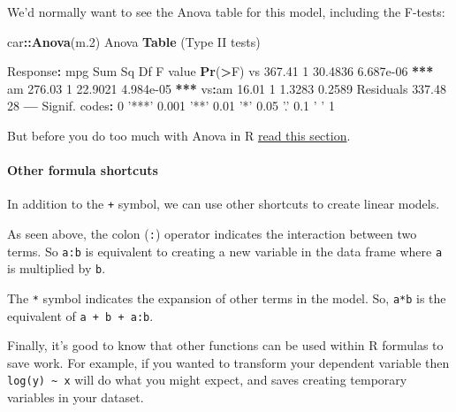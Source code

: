 \documentclass[]{article}
\newenvironment{Shaded}{\begin{snugshade}}{\end{snugshade}}
\newcommand{\DecValTok}[1]{\textcolor[rgb]{0.00,0.00,0.81}{#1}}
\newcommand{\ErrorTok}[1]{\textcolor[rgb]{0.64,0.00,0.00}{\textbf{#1}}}
\newcommand{\FloatTok}[1]{\textcolor[rgb]{0.00,0.00,0.81}{#1}}
\newcommand{\KeywordTok}[1]{\textcolor[rgb]{0.13,0.29,0.53}{\textbf{#1}}}
\newcommand{\NormalTok}[1]{#1}
\newcommand{\OperatorTok}[1]{\textcolor[rgb]{0.81,0.36,0.00}{\textbf{#1}}}
\newcommand{\StringTok}[1]{\textcolor[rgb]{0.31,0.60,0.02}{#1}}
\let\oldparagraph\paragraph
\renewcommand{\paragraph}[1]{\oldparagraph{#1}\mbox{}}
\begin{document}
We'd normally want to see the Anova table for this model, including the F-tests:

\begin{Shaded}
\begin{Highlighting}[]
\NormalTok{car}\OperatorTok{::}\KeywordTok{Anova}\NormalTok{(m}\FloatTok{.2}\NormalTok{)}
\NormalTok{Anova }\KeywordTok{Table}\NormalTok{ (Type II tests)}

\NormalTok{Response}\OperatorTok{:}\StringTok{ }\NormalTok{mpg}
\NormalTok{          Sum Sq Df F value    }\KeywordTok{Pr}\NormalTok{(}\OperatorTok{>}\NormalTok{F)    }
\NormalTok{vs        }\FloatTok{367.41}  \DecValTok{1} \FloatTok{30.4836} \FloatTok{6.687e-06} \OperatorTok{**}\ErrorTok{*}
\NormalTok{am        }\FloatTok{276.03}  \DecValTok{1} \FloatTok{22.9021} \FloatTok{4.984e-05} \OperatorTok{**}\ErrorTok{*}
\NormalTok{vs}\OperatorTok{:}\NormalTok{am      }\FloatTok{16.01}  \DecValTok{1}  \FloatTok{1.3283}    \FloatTok{0.2589}    
\NormalTok{Residuals }\FloatTok{337.48} \DecValTok{28}                      
\OperatorTok{---}
\NormalTok{Signif. codes}\OperatorTok{:}\StringTok{  }\DecValTok{0} \StringTok{'***'} \FloatTok{0.001} \StringTok{'**'} \FloatTok{0.01} \StringTok{'*'} \FloatTok{0.05} \StringTok{'.'} \FloatTok{0.1} \StringTok{' '} \DecValTok{1}
\end{Highlighting}
\end{Shaded}

But before you do too much with Anova in R \href{anova.html}{read this section}.

\hypertarget{other-formula-shortcuts}{%
\paragraph{Other formula shortcuts}\label{other-formula-shortcuts}}

In addition to the \texttt{+} symbol, we can use other shortcuts to create linear
models.

As seen above, the colon (\texttt{:}) operator indicates the interaction between two
terms. So \texttt{a:b} is equivalent to creating a new variable in the data frame where
\texttt{a} is multiplied by \texttt{b}.

The \texttt{*} symbol indicates the expansion of other terms in the model. So, \texttt{a*b} is
the equivalent of \texttt{a\ +\ b\ +\ a:b}.

Finally, it's good to know that other functions can be used within R formulas to
save work. For example, if you wanted to transform your dependent variable then
\texttt{log(y)\ \textasciitilde{}\ x} will do what you might expect, and saves creating temporary
variables in your dataset.
\end{document}
